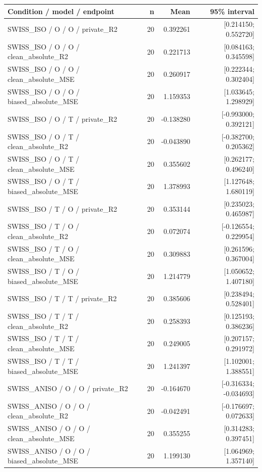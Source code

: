 \begin{longtable}{p{.56\linewidth}rrr}
\toprule Condition / model / endpoint & n & Mean & 95\% interval\\\midrule
SWISS\_ISO / O / O / private\_R2 & 20 & 0.392261 & [0.214150; 0.552720] \\
SWISS\_ISO / O / O / clean\_absolute\_R2 & 20 & 0.221713 & [0.084163; 0.345598] \\
SWISS\_ISO / O / O / clean\_absolute\_MSE & 20 & 0.260917 & [0.222344; 0.302404] \\
SWISS\_ISO / O / O / biased\_absolute\_MSE & 20 & 1.159353 & [1.033645; 1.298929] \\
SWISS\_ISO / O / T / private\_R2 & 20 & -0.138280 & [-0.993000; 0.392121] \\
SWISS\_ISO / O / T / clean\_absolute\_R2 & 20 & -0.043890 & [-0.382700; 0.205362] \\
SWISS\_ISO / O / T / clean\_absolute\_MSE & 20 & 0.355602 & [0.262177; 0.496240] \\
SWISS\_ISO / O / T / biased\_absolute\_MSE & 20 & 1.378993 & [1.127648; 1.680119] \\
SWISS\_ISO / T / O / private\_R2 & 20 & 0.353144 & [0.235023; 0.465987] \\
SWISS\_ISO / T / O / clean\_absolute\_R2 & 20 & 0.072074 & [-0.126554; 0.229954] \\
SWISS\_ISO / T / O / clean\_absolute\_MSE & 20 & 0.309883 & [0.261596; 0.367004] \\
SWISS\_ISO / T / O / biased\_absolute\_MSE & 20 & 1.214779 & [1.050652; 1.407180] \\
SWISS\_ISO / T / T / private\_R2 & 20 & 0.385606 & [0.238494; 0.528401] \\
SWISS\_ISO / T / T / clean\_absolute\_R2 & 20 & 0.258393 & [0.125193; 0.386236] \\
SWISS\_ISO / T / T / clean\_absolute\_MSE & 20 & 0.249005 & [0.207157; 0.291972] \\
SWISS\_ISO / T / T / biased\_absolute\_MSE & 20 & 1.241397 & [1.102001; 1.388551] \\
SWISS\_ANISO / O / O / private\_R2 & 20 & -0.164670 & [-0.316334; -0.034693] \\
SWISS\_ANISO / O / O / clean\_absolute\_R2 & 20 & -0.042491 & [-0.176697; 0.072633] \\
SWISS\_ANISO / O / O / clean\_absolute\_MSE & 20 & 0.355255 & [0.314283; 0.397451] \\
SWISS\_ANISO / O / O / biased\_absolute\_MSE & 20 & 1.199130 & [1.064969; 1.357140] \\

\end{longtable}
